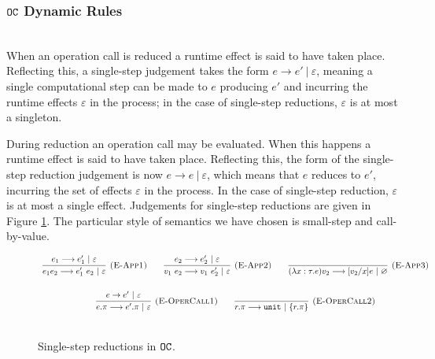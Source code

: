 \subsubsection{$\mathtt{OC}$ Dynamic Rules}~\\

When an operation call is reduced a runtime effect is said to have taken place. Reflecting this, a single-step judgement takes the form $e \longrightarrow e'~|~\varepsilon$, meaning a single computational step can be made to $e$ producing $e'$ and incurring the runtime effects $\varepsilon$ in the process; in the case of single-step reductions, $\varepsilon$ is at most a singleton.

During reduction an operation call may be evaluated. When this happens a runtime effect is said to have taken place. Reflecting this, the form of the single-step reduction judgement is now $e \longrightarrow e~|~\varepsilon$, which means that $e$ reduces to $e'$, incurring the set of effects $\varepsilon$ in the process. In the case of single-step reduction, $\varepsilon$ is at most a single effect. Judgements for single-step reductions are given in Figure \ref{fig:opercalc_singlestep}. The particular style of semantics we have chosen is small-step and call-by-value.

\begin{figure}[h]

\noindent
{}

\[
\begin{array}{c}

\infer[\textsc{(E-App1)}]
	{e_1 e_2 \longrightarrow e_1'~ e_2~|~\varepsilon}
	{e_1 \longrightarrow e_1'~|~\varepsilon}
	~~~~~~
\infer[\textsc{(E-App2)}]
	{v_1 ~ e_2 \longrightarrow v_1 ~ e_2'~|~\varepsilon} 
	{e_2 \longrightarrow e_2'~|~\varepsilon}
~~~~~~
\infer[\textsc{(E-App3)}]
	{ (\lambda x: \tau. e) v_2 \longrightarrow [ v_2/x] e~|~\varnothing }
	{}\\[4ex]
	
\infer[\textsc{(E-OperCall1)}]
	{ e.\pi \longrightarrow  e'.\pi~|~\varepsilon }
	{ e \rightarrow  e'~|~\varepsilon}
		
	~~~~~~
	
\infer[\textsc{(E-OperCall2)}]
	{r.\pi \longrightarrow \kwa{unit}~|~\{ r.\pi \} }
	{}
	 \\[4ex]
	 
\end{array}
\]


\vspace{-7pt}
\caption{Single-step reductions in $\mathtt{OC}$.}
\label{fig:opercalc_singlestep}
\end{figure}

